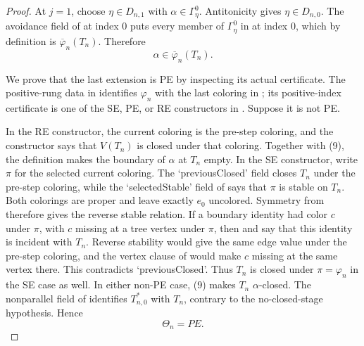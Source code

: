 \begin{proof}
At $j=1$, choose $\eta\in D_{n,1}$ with
$\alpha\in\Gamma^0_\eta$.  Antitonicity gives
$\eta\in D_{n,0}$.  The avoidance field of
 at index $0$ puts every member of
$\Gamma^0_\eta$ in
 at index $0$, which by definition
is $\overline\varphi_n(T_n)$.  Therefore
\[
                         \alpha\in\overline\varphi_n(T_n).     \tag{9}
\]

We prove that the last extension is PE by inspecting its actual
certificate.  The positive-rung data in
 identifies $\varphi_n$ with the last
coloring in ; its positive-index certificate is
one of the SE, PE, or RE constructors in
.  Suppose it is not PE.

In the RE constructor, the current coloring is the pre-step coloring,
and the constructor says that $V(T_n)$ is closed under that coloring.
Together with (9), the definition
 makes the boundary of $\alpha$ at
$T_n$ empty.  In the SE constructor, write $\pi$ for the selected current
coloring.  The `previousClosed' field closes $T_n$ under the pre-step
coloring, while the `selectedStable' field of
 says that $\pi$ is stable on $T_n$.
Both colorings are proper and leave exactly $e_0$ uncolored.  Symmetry
from  therefore gives the reverse stable relation.  If a
boundary identity had color $c$ under $\pi$, with $c$ missing at a tree
vertex under $\pi$, then  and
 say that this identity is incident with
$T_n$.  Reverse stability would give the same edge value under the
pre-step coloring, and the vertex clause of
 would make $c$ missing at the same vertex
there.  This contradicts `previousClosed'.  Thus $T_n$ is closed under
$\pi=\varphi_n$ in the SE case as well.  In either non-PE case, (9)
makes $T_n$ $\alpha$-closed.  The nonparallel field of
 identifies $T_{n,0}^{*}$ with $T_n$, contrary
to the no-closed-stage hypothesis.  Hence
\[
                              \Theta_n=PE.                       \tag{10}
\]


\end{proof}
